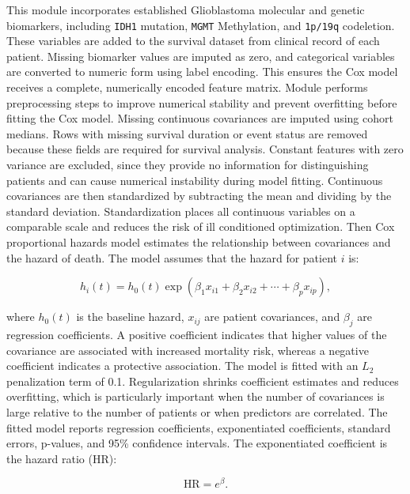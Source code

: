 This module incorporates established Glioblastoma molecular and genetic biomarkers, including \texttt{IDH1} mutation, \texttt{MGMT} Methylation, and \texttt{1p/19q} codeletion. These variables are added to the survival dataset from clinical record of each patient. Missing biomarker values are imputed as zero, and categorical variables are converted to numeric form using label encoding. This ensures the Cox model receives a complete, numerically encoded feature matrix. Module performs preprocessing steps to improve numerical stability and prevent overfitting before fitting the Cox model. Missing continuous covariances are imputed using cohort medians. Rows with missing survival duration or event status are removed because these fields are required for survival analysis. Constant features with zero variance are excluded, since they provide no information for distinguishing patients and can cause numerical instability during model fitting. Continuous covariances are then standardized by subtracting the mean and dividing by the standard deviation. Standardization places all continuous variables on a comparable scale and reduces the risk of ill conditioned optimization. Then Cox proportional hazards model estimates the relationship between covariances and the hazard of death. The model assumes that the hazard for patient $i$ is:

\begin{equation}
h_i(t) = h_0(t)\exp(\beta_1x_{i1} + \beta_2x_{i2} + \cdots + \beta_px_{ip}),
\end{equation}

where $h_0(t)$ is the baseline hazard, $x_{ij}$ are patient covariances, and $\beta_j$ are regression coefficients. A positive coefficient indicates that higher values of the covariance are associated with increased mortality risk, whereas a negative coefficient indicates a protective association. The model is fitted with an $L_2$ penalization term of 0.1. Regularization shrinks coefficient estimates and reduces overfitting, which is particularly important when the number of covariances is large relative to the number of patients or when predictors are correlated. The fitted model reports regression coefficients, exponentiated coefficients, standard errors, p-values, and 95\% confidence intervals. The exponentiated coefficient is the hazard ratio (HR):

\begin{equation}
\text{HR} = e^{\beta}.
\end{equation}

